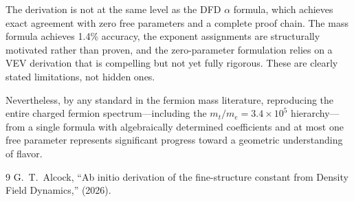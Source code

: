 \documentclass[11pt,a4paper]{article}
\theoremstyle{definition}
\theoremstyle{remark}
\begin{document}
The derivation is not at the same level as the DFD
$\alpha$ formula, which achieves exact agreement with zero free
parameters and a complete proof chain.
The mass formula achieves 1.4\% accuracy, the exponent assignments
are structurally motivated rather than proven, and the
zero-parameter formulation relies on a VEV derivation that is
compelling but not yet fully rigorous.
These are clearly stated limitations, not hidden ones.

Nevertheless, by any standard in the fermion mass literature,
reproducing the entire charged fermion spectrum---including
the $m_t/m_e = 3.4\times 10^5$ hierarchy---from a single formula
with algebraically determined coefficients and at most one free
parameter represents significant progress toward a geometric
understanding of flavor.

\begin{thebibliography}{9}
G.~T.~Alcock, ``Ab initio derivation of the fine-structure constant
from Density Field Dynamics,'' (2026).
\end{thebibliography}
\end{document}
